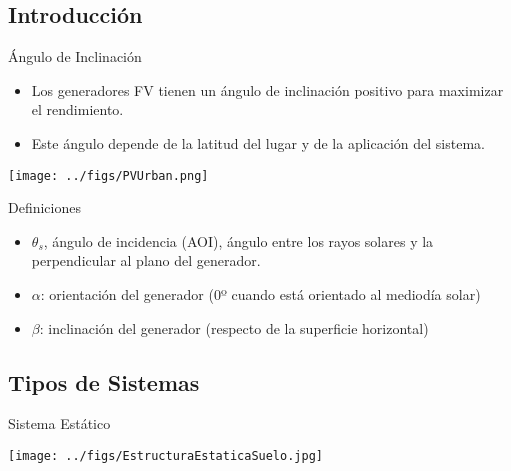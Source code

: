 \documentclass[xcolor={usenames,svgnames,dvipsnames}]{beamer}
\begin{document}
\subsection{Introducción}
\label{sec:org5fd4e27}

\begin{frame}[label={sec:orgffd86f3}]{Ángulo de Inclinación}
\begin{itemize}
\item Los generadores FV tienen un ángulo de inclinación positivo para maximizar el rendimiento.
\item Este ángulo depende de la latitud del lugar y de la aplicación del sistema.
\end{itemize}

\begin{center}
\texttt{[image: ../figs/PVUrban.png]}
\end{center}
\end{frame}

\begin{frame}[label={sec:orgaab779b}]{Definiciones}
\begin{itemize}
\item \(\theta_s\), \alert{ángulo de incidencia (AOI)}, ángulo entre los rayos solares y la perpendicular al plano del generador.
\item \(\alpha\): \alert{orientación del generador} (0º cuando está orientado al mediodía solar)
\item \(\beta\): \alert{inclinación del generador} (respecto de la superficie horizontal)
\end{itemize}
\end{frame}
\subsection{Tipos de Sistemas}
\label{sec:orgb91fe35}
\begin{frame}[label={sec:org3d607de}]{Sistema Estático}
\begin{center}
\texttt{[image: ../figs/EstructuraEstaticaSuelo.jpg]}
\end{center}
\end{frame}
\end{document}
